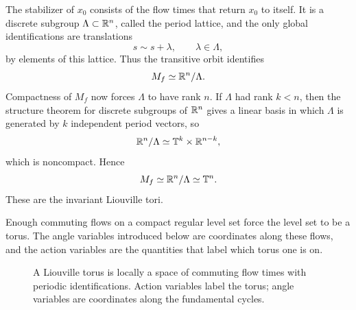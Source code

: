 \begin{derivation}
The stabilizer of \(x_0\) consists of the flow times that return \(x_0\) to
itself. It is a discrete subgroup \(\Lambda\subset\mathbb{R}^n\), called the period
lattice, and the only global identifications are translations
\[
  s\sim s+\lambda,\qquad \lambda\in\Lambda,
\]
by elements of this lattice. Thus the transitive orbit identifies
\[
  M_f\simeq \mathbb{R}^n/\Lambda .
\]
Compactness of \(M_f\) now forces \(\Lambda\) to have rank \(n\). If
\(\Lambda\) had rank \(k<n\), then
the structure theorem for discrete subgroups of \(\mathbb{R}^n\) gives a linear basis
in which \(\Lambda\) is generated by \(k\) independent period vectors, so
\[
  \mathbb{R}^n/\Lambda\simeq \mathbb T^k\times\mathbb{R}^{n-k},
\]
which is noncompact. Hence
\[
  M_f\simeq \mathbb{R}^n/\Lambda\simeq \mathbb T^n.
\]
These are the invariant Liouville tori.
\end{derivation}

Enough commuting flows on a compact regular level set force the level set to be
a torus. The angle variables introduced below are coordinates
along these flows, and the action variables are the quantities that label which
torus one is on.

\begin{figure}[htbp]
\centering
{}
\caption{A Liouville torus is locally a space of commuting flow times with
periodic identifications. Action variables label the torus; angle variables
are coordinates along the fundamental cycles.}
\label{fig:liouville-flat-torus}
\end{figure}

